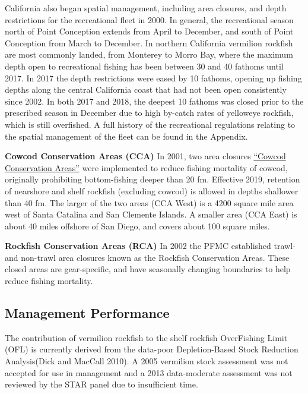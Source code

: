 \documentclass[
  english,
  a4paper,
]{article}
\begin{document}
California also began spatial management, including area closures, and depth
restrictions for the recreational fleet in 2000. In general, the recreational
season north of Point Conception
extends from April to December, and south of Point Conception from March to December.
In northern California vermilion rockfish are most commonly landed, from Monterey to Morro Bay, where the
maximum depth open to recreational fishing has been between 30 and 40
fathoms until 2017. In 2017 the depth restrictions were eased by 10 fathoms,
opening up fishing depths along the central California coast that had not been
open consistently since 2002. In
both 2017 and 2018, the deepest 10 fathoms was closed prior to the prescribed
season in December due to high by-catch rates of yelloweye rockfish, which is still
overfished. A full history of the recreational
regulations relating to the spatial management of the fleet can be found in the Appendix.

\textbf{Cowcod Conservation Areas (CCA)}
In 2001, two area closures \href{https://nrm.dfg.ca.gov/FileHandler.ashx?DocumentID=36132\&inline}{``Cowcod Conservation Areas''} were implemented to reduce fishing mortality of cowcod, originally prohibiting bottom-fishing deeper than 20 fm. Effective 2019, retention of nearshore and shelf rockfish (excluding cowcod) is allowed in depths shallower than 40 fm. The larger of the two areas (CCA West) is a 4200 square mile area west of Santa Catalina and San Clemente Islands. A smaller area (CCA East) is about 40 miles offshore of San Diego, and covers about 100 square miles.

\textbf{Rockfish Conservation Areas (RCA)}
In 2002 the PFMC established trawl- and non-trawl area closures known as the Rockfish Conservation Areas. These closed areas are gear-specific, and have seasonally changing boundaries to help reduce fishing mortality.

\hypertarget{management-performance-1}{%
\subsection{Management Performance}\label{management-performance-1}}

The contribution of vermilion rockfish to the shelf rockfish OverFishing Limit (OFL) is currently derived from the data-poor Depletion-Based Stock Reduction Analysis(Dick and MacCall 2010). A 2005
vermilion stock assessment was not accepted for use in management and a 2013 data-moderate assessment was not reviewed by the STAR panel due to insufficient time.
\end{document}
